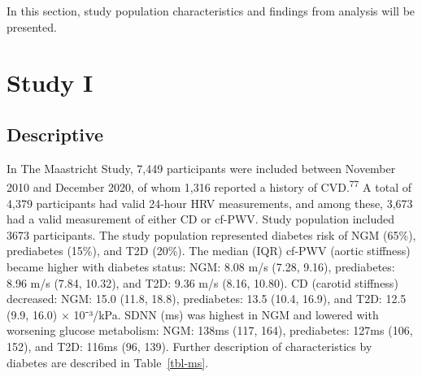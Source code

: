 \documentclass[
  letterpaper,
  headsepline=true,
  open=any]{scrbook}
\begin{document}
\newpage

In this section, study population characteristics and findings from
analysis will be presented.

\hypertarget{study-i}{%
\section{Study I}\label{study-i}}

\hypertarget{descriptive}{%
\subsection{Descriptive}\label{descriptive}}

In The Maastricht Study, 7,449 participants were included between
November 2010 and December 2020, of whom 1,316 reported a history of
CVD.\textsuperscript{77} A total of 4,379 participants had valid 24-hour
HRV measurements, and among these, 3,673 had a valid measurement of
either CD or cf-PWV. Study population included 3673 participants. The
study population represented diabetes risk of NGM (65\%), prediabetes
(15\%), and T2D (20\%). The median (IQR) cf-PWV (aortic stiffness)
became higher with diabetes status: NGM: 8.08 m/s (7.28, 9.16),
prediabetes: 8.96 m/s (7.84, 10.32), and T2D: 9.36 m/s (8.16, 10.80). CD
(carotid stiffness) decreased: NGM: 15.0 (11.8, 18.8), prediabetes: 13.5
(10.4, 16.9), and T2D: 12.5 (9.9, 16.0) × 10⁻³/kPa. SDNN (ms) was
highest in NGM and lowered with worsening glucose metabolism: NGM: 138ms
(117, 164), prediabetes: 127ms (106, 152), and T2D: 116ms (96, 139).
Further description of characteristics by diabetes are described in
Table~\ref{tbl-ms}.

\end{document}
